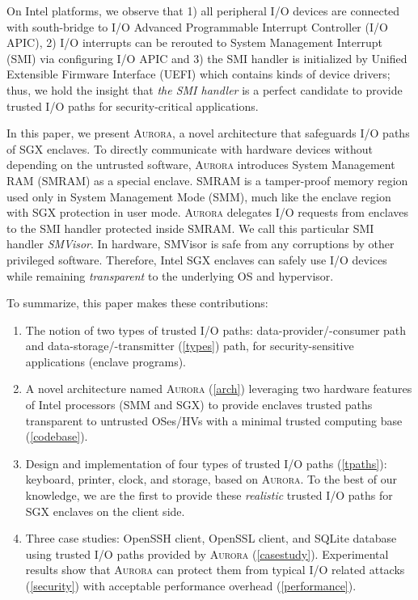 \documentclass[journal,twocolumn,letterpaper,10pt]{IEEEtran}
\begin{document}
On Intel platforms, we observe that 1) all peripheral I/O devices are connected with south-bridge to I/O Advanced Programmable Interrupt Controller (I/O APIC), 2) I/O interrupts can be rerouted to System Management Interrupt (SMI) via configuring I/O APIC and 3) the SMI handler is initialized by Unified Extensible Firmware Interface (UEFI) which contains kinds of device drivers; thus, we hold the insight that \textit{the SMI handler} is a perfect candidate to provide trusted I/O paths for security-critical applications.

In this paper, we present \textsc{Aurora}, a novel architecture that safeguards I/O paths of SGX enclaves. To directly communicate with hardware devices without depending on the untrusted software, \textsc{Aurora} introduces System Management RAM (SMRAM) as a special enclave. SMRAM is a tamper-proof memory region used only in System Management Mode (SMM), much like the enclave region with SGX protection in user mode. \textsc{Aurora} delegates I/O requests from enclaves to the SMI handler protected inside SMRAM. We call this particular SMI handler \textit{SMVisor}. In hardware, SMVisor is safe from any corruptions by other privileged software. Therefore, Intel SGX enclaves can safely use I/O devices while remaining \textit{transparent} to the underlying OS and hypervisor.

To summarize, this paper makes these contributions:
\begin{enumerate}[]
\item The notion of two types of trusted I/O paths: data-provider/-consumer path and data-storage/-transmitter (\autoref{types}) path, for security-sensitive applications (enclave programs).
\item A novel architecture named \textsc{Aurora} (\autoref{arch}) leveraging two hardware features of Intel processors (SMM and SGX) to provide enclaves trusted paths transparent to untrusted OSes/HVs with a minimal trusted computing base (\autoref{codebase}).
\item Design and implementation of four types of trusted I/O paths (\autoref{tpaths}): keyboard, printer, clock, and storage, based on \textsc{Aurora}.  To the best of our knowledge, we are the first to provide these \emph{realistic} trusted I/O paths for SGX enclaves on the client side.
\item Three case studies: OpenSSH client, OpenSSL client, and SQLite database using trusted I/O paths provided by \textsc{Aurora} (\autoref{casestudy}). Experimental results show that \textsc{Aurora} can protect them from typical I/O related attacks (\autoref{security}) with acceptable performance overhead (\autoref{performance}).
\end{enumerate}
\end{document}
